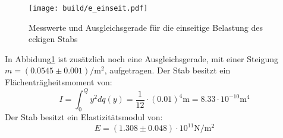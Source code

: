 \begin{figure}[H]
    \centering
    \texttt{[image: build/e\_einseit.pdf]}
    \caption{Messwerte und Ausgleichsgerade für die einseitige Belastung des eckigen Stabs}
    \label{fig:plot2}
\end{figure}
In Abbidung\ref{fig:plot2} ist zusätzlich noch eine Ausgleichsgerade, mit einer Steigung $m=(0.0545\pm0.001)\si{\per\meter\squared}$, aufgetragen.
Der Stab besitzt ein Flächenträgheitsmoment von:
\begin{equation*}
  I=\int_0^Q y^2 dq(y) = \frac{1}{12}\cdot (0.01)^4\si{\meter} = 8.33\cdot 10^{-10}\si{\meter}^4
\end{equation*}
Der Stab besitzt ein Elastizitätsmodul von:
\begin{equation*}
  E= (1.308\pm 0.048)\cdot10^{11} \si{\newton\per\meter\squared}
\end{equation*}
%
